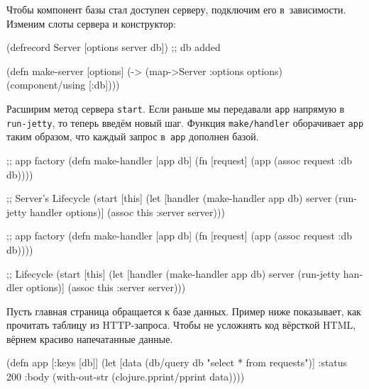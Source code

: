 Чтобы компонент базы стал доступен серверу, подключим его в~зависимости. Изменим
слоты сервера и конструктор:

\begin{english}
  \begin{clojure}
(defrecord Server
  [options server db]) ;; db added

(defn make-server
  [options]
  (-> (map->Server {:options options})
      (component/using [:db])))
  \end{clojure}
\end{english}

Расширим метод сервера \verb|start|. Если раньше мы передавали \verb|app|
напрямую в \verb|run-jetty|, то теперь введём новый шаг. Функция
\texttt{make\-/handler} оборачивает \verb|app| таким образом, что каждый запрос
в~\verb|app| дополнен базой.

\pagebreaklarge

\ifnarrow

\begin{english}
  \begin{clojure}
;; app factory
(defn make-handler [app db]
  (fn [request]
    (app (assoc request :db db))))

;; Server's Lifecycle
(start [this]
  (let [handler (make-handler app db)
        server (run-jetty handler
                 options)]
    (assoc this :server server)))
  \end{clojure}
\end{english}

\else

\begin{english}
  \begin{clojure}
;; app factory
(defn make-handler [app db]
  (fn [request]
    (app (assoc request :db db))))

;; Lifecycle
(start [this]
  (let [handler (make-handler app db)
        server (run-jetty handler options)]
    (assoc this :server server)))
  \end{clojure}
\end{english}

\fi

Пусть главная страница обращается к базе данных. Пример ниже показывает, как
прочитать таблицу из HTTP-запроса. Чтобы не усложнять код вёрсткой HTML, вёрнем
красиво напечатанные данные.

\ifnarrow

\begin{english}
  \begin{clojure}
(defn app [{:keys [db]}]
  (let [data (db/query db
               "select * from requests")]
    {:status 200
     :body (with-out-str
             (clojure.pprint/pprint
               data))}))
  \end{clojure}
\end{english}

